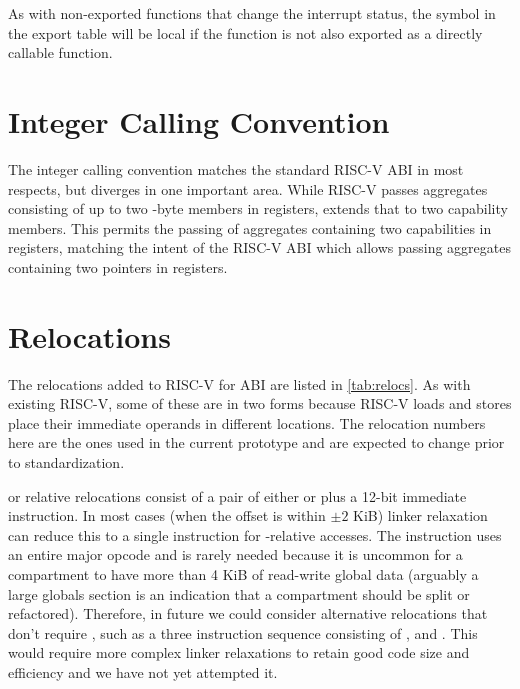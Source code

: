 As with non-exported functions that change the interrupt status, the symbol in the export table will be local if the function is not also exported as a directly callable function.

\section{Integer Calling Convention}

The \cherimcu{} integer calling convention matches the standard RISC-V ABI in most respects, but diverges in one important area.
While RISC-V passes aggregates consisting of up to two \xlen-byte members in registers, \cherimcu{} extends that to two capability members.
This permits the passing of aggregates containing two capabilities in registers, matching the intent of the RISC-V ABI which allows passing aggregates containing two pointers in registers.

\section{Relocations}
\label{sec:relocs}

The relocations added to RISC-V for \cherimcu{} ABI are listed in \cref{tab:relocs}.
As with existing RISC-V, some of these are in two forms because RISC-V loads and stores place their immediate operands in different locations.
The relocation numbers here are the ones used in the current prototype and are expected to change prior to standardization.

\PCC{} or \CGP{} relative relocations consist of a pair of either  or  plus a 12-bit immediate instruction.
In most cases (when the offset is within $\pm2$ KiB) linker relaxation can reduce this to a single instruction for \CGP-relative accesses.
The  instruction uses an entire major opcode and is rarely needed because it is uncommon for a compartment to have more than 4 KiB of read-write global data (arguably a large globals section is an indication that a compartment should be split or refactored).
Therefore, in future we could consider alternative relocations that don't require , such as a three instruction sequence consisting of ,  and .
This would require more complex linker relaxations to retain good code size and efficiency and we have not yet attempted it.

